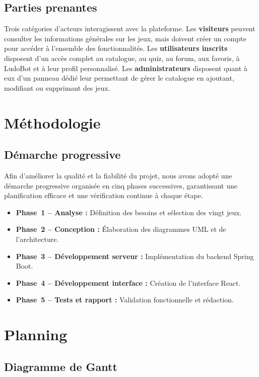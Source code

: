 \documentclass[12pt,a4paper]{report}
\begin{document}
\subsection{Parties prenantes}

Trois catégories d'acteurs interagissent avec la plateforme. Les \textbf{visiteurs} peuvent
consulter les informations générales sur les jeux, mais doivent créer un compte pour
accéder à l'ensemble des fonctionnalités. Les \textbf{utilisateurs inscrits} disposent
d'un accès complet au catalogue, au quiz, au forum, aux favoris, à LudoBot et à leur
profil personnalisé. Les \textbf{administrateurs} disposent quant à eux d'un panneau
dédié leur permettant de gérer le catalogue en ajoutant, modifiant ou supprimant des jeux.

\section{Méthodologie}

\subsection{Démarche progressive}

Afin d'améliorer la qualité et la fiabilité du projet, nous avons adopté une démarche
progressive organisée en cinq phases successives, garantissant une planification efficace
et une vérification continue à chaque étape.

\begin{itemize}[leftmargin=2cm]
  \item \textbf{Phase~1 -- Analyse :} Définition des besoins et sélection des vingt jeux.
  \item \textbf{Phase~2 -- Conception :} Élaboration des diagrammes UML et de l'architecture.
  \item \textbf{Phase~3 -- Développement serveur :} Implémentation du backend Spring Boot.
  \item \textbf{Phase~4 -- Développement interface :} Création de l'interface React.
  \item \textbf{Phase~5 -- Tests et rapport :} Validation fonctionnelle et rédaction.
\end{itemize}

\section{Planning}

\subsection{Diagramme de Gantt}
\end{document}
